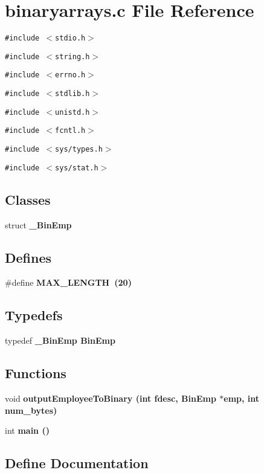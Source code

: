 \section{binaryarrays.c File Reference}
\label{binaryarrays_8c}
{\tt \#include $<$stdio.h$>$}\par
{\tt \#include $<$string.h$>$}\par
{\tt \#include $<$errno.h$>$}\par
{\tt \#include $<$stdlib.h$>$}\par
{\tt \#include $<$unistd.h$>$}\par
{\tt \#include $<$fcntl.h$>$}\par
{\tt \#include $<$sys/types.h$>$}\par
{\tt \#include $<$sys/stat.h$>$}\par
\subsection*{Classes}
\begin{CompactItemize}
\item 
struct \bf{\_\-Bin\-Emp}
\end{CompactItemize}
\subsection*{Defines}
\begin{CompactItemize}
\item 
\#define \bf{MAX\_\-LENGTH}~(20)
\end{CompactItemize}
\subsection*{Typedefs}
\begin{CompactItemize}
\item 
typedef \bf{\_\-Bin\-Emp} \bf{Bin\-Emp}
\end{CompactItemize}
\subsection*{Functions}
\begin{CompactItemize}
\item 
void \bf{output\-Employee\-To\-Binary} (int fdesc, \bf{Bin\-Emp} $\ast$emp, int num\_\-bytes)
\item 
int \bf{main} ()
\end{CompactItemize}


\subsection{Define Documentation}
